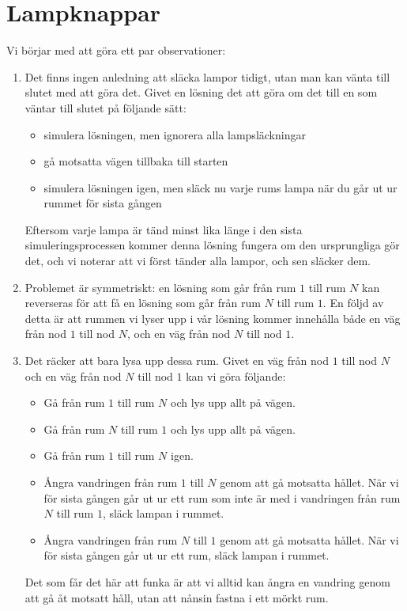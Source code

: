 \section{Lampknappar}
Vi börjar med att göra ett par observationer:
\begin{enumerate}
  \item Det finns ingen anledning att släcka lampor tidigt, utan man kan vänta till slutet med att göra det.
    Givet en lösning det att göra om det till en som väntar till slutet på följande sätt:
    \begin{itemize}
      \item simulera lösningen, men ignorera alla lampsläckningar
      \item gå motsatta vägen tillbaka till starten
      \item simulera lösningen igen, men släck nu varje rums lampa när du går ut ur rummet för sista gången
    \end{itemize}
    Eftersom varje lampa är tänd minst lika länge i den sista simuleringsprocessen kommer denna lösning fungera om den ursprungliga gör det,
    och vi noterar att vi först tänder alla lampor, och sen släcker dem.
  \item Problemet är symmetriskt: en lösning som går från rum $1$ till rum $N$ kan reverseras för att få en lösning som går från rum $N$ till rum $1$.
    En följd av detta är att rummen vi lyser upp i vår lösning kommer innehålla både en väg från nod $1$ till nod $N$, och en väg från nod $N$ till nod $1$.
  \item Det räcker att bara lysa upp dessa rum. Givet en väg från nod $1$ till nod $N$ och en väg från nod $N$ till nod $1$ kan vi göra följande:
    \begin{itemize}
      \item Gå från rum $1$ till rum $N$ och lys upp allt på vägen.
      \item Gå från rum $N$ till rum $1$ och lys upp allt på vägen.
      \item Gå från rum $1$ till rum $N$ igen.
      \item Ångra vandringen från rum $1$ till $N$ genom att gå motsatta hållet.
        När vi för sista gången går ut ur ett rum som inte är med i vandringen från rum $N$ till rum $1$, släck lampan i rummet.
      \item Ångra vandringen från rum $N$ till $1$ genom att gå motsatta hållet.
        När vi för sista gången går ut ur ett rum, släck lampan i rummet.
    \end{itemize}
    Det som får det här att funka är att vi alltid kan ångra en vandring genom att gå åt motsatt håll, utan att nånsin fastna i ett mörkt rum.
\end{enumerate}

